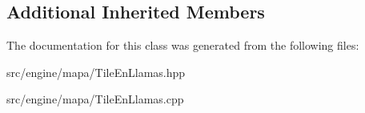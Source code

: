 \subsection*{Additional Inherited Members}


The documentation for this class was generated from the following files\+:\begin{DoxyCompactItemize}
\item 
src/engine/mapa/Tile\+En\+Llamas.\+hpp\item 
src/engine/mapa/Tile\+En\+Llamas.\+cpp\end{DoxyCompactItemize}
